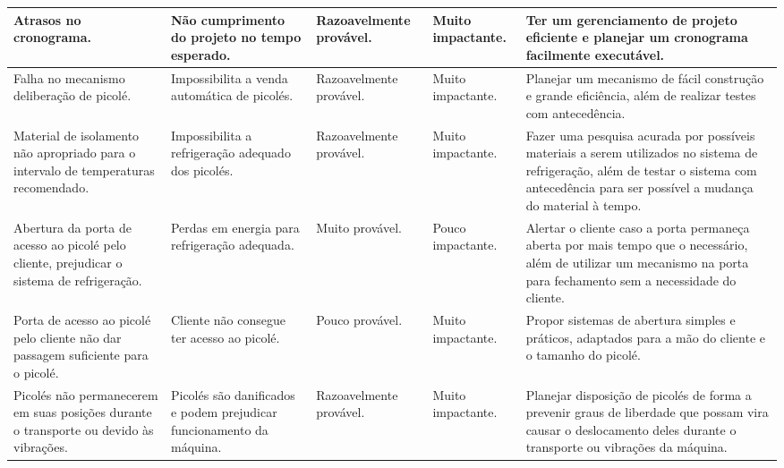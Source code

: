 \begin{longtable}{|m{2.8cm}|m{4cm}|m{2.5cm}|m{2.2cm}|m{4cm}|}
Atrasos no cronograma.                                                                              & Não cumprimento do projeto no tempo esperado.                            & Razoavelmente provável. & Muito impactante.         & Ter um gerenciamento de projeto eficiente e planejar um cronograma facilmente executável.                                                                                                                            \\ \hline
Falha no mecanismo deliberação de picolé.                                                      & Impossibilita a venda automática de picolés.                             & Razoavelmente provável. & Muito impactante.        & Planejar um mecanismo de fácil construção e grande eficiência, além de realizar testes com antecedência.                                                                                                         \\ \hline
Material de isolamento não apropriado para o intervalo de temperaturas recomendado.      & Impossibilita a refrigeração adequado dos picolés.                    & Razoavelmente provável. & Muito impactante.         & Fazer uma pesquisa acurada por possíveis materiais a serem utilizados no sistema de refrigeração, além de testar o sistema com antecedência para ser  possível a mudança do material à tempo.             \\ \hline
Abertura da porta de acesso ao picolé pelo cliente, prejudicar o sistema de refrigeração. & Perdas em energia para refrigeração adequada.                         & Muito provável.         & Pouco impactante.         & Alertar o cliente caso a porta permaneça aberta por mais tempo que o necessário, além de utilizar um mecanismo na porta para fechamento sem a necessidade do cliente.                                    \\ \hline
Porta de acesso ao picolé pelo cliente não dar passagem suficiente para o picolé.              & Cliente não consegue ter acesso ao picolé.                              & Pouco provável.         & Muito impactante.         & Propor sistemas de abertura simples e práticos, adaptados para a mão do cliente e o tamanho do picolé.                                                                                                            \\ \hline
Picolés não permanecerem em suas posições durante o transporte ou devido às vibrações.    & Picolés são danificados e podem prejudicar funcionamento da máquina. & Razoavelmente provável. & Muito impactante.         & Planejar disposição de picolés de forma a prevenir graus de liberdade que possam vira causar o deslocamento deles durante o transporte ou vibrações da máquina.                                                 \\ \hline

\end{longtable}
